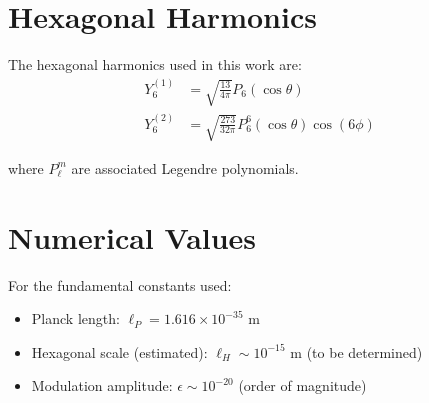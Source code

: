 \documentclass[12pt,a4paper]{article}
\begin{document}
\section{Hexagonal Harmonics}

The hexagonal harmonics used in this work are:
\begin{align}
    Y_6^{(1)} &= \sqrt{\frac{13}{4\pi}}P_6(\cos\theta) \\
    Y_6^{(2)} &= \sqrt{\frac{273}{32\pi}}P_6^6(\cos\theta)\cos(6\phi)
\end{align}

where $P_\ell^m$ are associated Legendre polynomials.

\section{Numerical Values}

For the fundamental constants used:
\begin{itemize}
    \item Planck length: $\ell_P = 1.616 \times 10^{-35}$ m
    \item Hexagonal scale (estimated): $\ell_H \sim 10^{-15}$ m (to be determined)
    \item Modulation amplitude: $\epsilon \sim 10^{-20}$ (order of magnitude)
\end{itemize}
\end{document}
